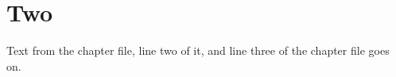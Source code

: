 \section{Two}
Text from the chapter file, line two of it,
and line three of the chapter file goes on.
